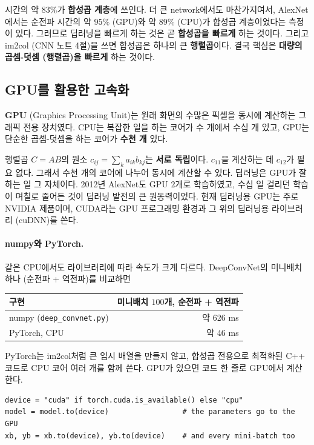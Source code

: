 \documentclass[11pt,a4paper]{article}
\begin{document}
시간의 약 83\%가 \textbf{합성곱 계층}에 쓰인다.
더 큰 network에서도 마찬가지여서, AlexNet에서는 순전파 시간의 약 $95\%$ (GPU)와 약 $89\%$ (CPU)가 합성곱 계층이었다는 측정이 있다.
그러므로 딥러닝을 빠르게 하는 것은 곧 \textbf{합성곱을 빠르게} 하는 것이다.
그리고 im2col (CNN 노트 4절)을 쓰면 합성곱은 하나의 큰 \textbf{행렬곱}이다.
결국 핵심은 \textbf{대량의 곱셈-덧셈 (행렬곱)을 빠르게} 하는 것이다.

\subsection{GPU를 활용한 고속화}\label{sec:gpu}

\textbf{GPU} (Graphics Processing Unit)는 원래 화면의 수많은 픽셀을 동시에 계산하는 그래픽 전용 장치였다.
CPU는 복잡한 일을 하는 코어가 수 개에서 수십 개 있고, GPU는 단순한 곱셈-덧셈을 하는 코어가 \textbf{수천 개} 있다.

행렬곱 $C=AB$의 원소 $c_{ij}=\sum_k a_{ik}b_{kj}$는 \textbf{서로 독립}이다. $c_{11}$을 계산하는 데 $c_{12}$가 필요 없다.
그래서 수천 개의 코어에 나누어 동시에 계산할 수 있다. 딥러닝은 GPU가 잘하는 일 그 자체이다.
2012년 AlexNet도 GPU $2$개로 학습하였고, 수십 일 걸리던 학습이 며칠로 줄어든 것이 딥러닝 발전의 큰 원동력이었다.
현재 딥러닝용 GPU는 주로 NVIDIA 제품이며, CUDA라는 GPU 프로그래밍 환경과 그 위의 딥러닝용 라이브러리 (cuDNN)를 쓴다.

\paragraph{numpy와 PyTorch.}
같은 CPU에서도 라이브러리에 따라 속도가 크게 다르다. DeepConvNet의 미니배치 하나 (순전파 + 역전파)를 비교하면

\begin{center}
{\small
\begin{tabular}{@{}lr@{}}
\toprule
구현 & 미니배치 $100$개, 순전파 + 역전파 \\
\midrule
numpy (\texttt{deep\_convnet.py}) & 약 626 ms \\
PyTorch, CPU & 약 46 ms \\
\bottomrule
\end{tabular}}
\end{center}

PyTorch는 im2col처럼 큰 임시 배열을 만들지 않고, 합성곱 전용으로 최적화된 C++ 코드로 CPU 코어 여러 개를 함께 쓴다.
GPU가 있으면 코드 한 줄로 GPU에서 계산한다.

\begin{lstlisting}[numbers=none]
device = "cuda" if torch.cuda.is_available() else "cpu"
model = model.to(device)                 # the parameters go to the GPU
xb, yb = xb.to(device), yb.to(device)    # and every mini-batch too
\end{lstlisting}
\end{document}
